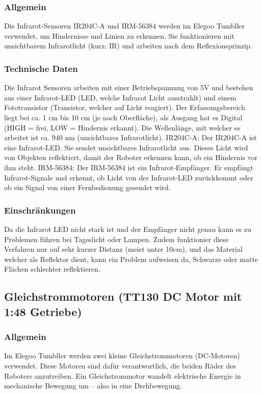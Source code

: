 \subsubsection{Allgemein}
Die Infrarot-Sensoren IR204C-A und IRM-56384 werden im Elegoo Tumbller verwendet, um Hindernisse und Linien zu erkennen.
Sie funktionieren mit unsichtbarem Infrarotlicht (kurz: IR) und arbeiten nach dem Reflexionsprinzip.
\subsubsection{Technische Daten}
Die Infrarot Sensoren arbeiten mit einer Betriebspannung von 5V und bestehen aus einer Infrarot-LED (LED, welche Infrarot Licht ausstrahlt) und 
einem Fototransistor (Transistor, welcher auf Licht reagiert). 
Der Erfassungsbereich liegt bei ca. 1 cm bis 10 cm (je nach Oberfläche), als Ausgang hat es Digital (HIGH = frei, LOW = Hindernis erkannt). 
Die Wellenlänge, mit welcher es arbeitet ist ca. 940 nm (unsichtbares Infrarotlicht).
IR204C-A:
Der IR204C-A ist eine Infrarot-LED. Sie sendet unsichtbares Infrarotlicht aus. 
Dieses Licht wird von Objekten reflektiert, damit der Roboter erkennen kann, ob ein Hindernis vor ihm steht.
IRM-56384:
Der IRM-56384 ist ein Infrarot-Empfänger. Er empfängt Infrarot-Signale und erkennt, ob Licht von der Infrarot-LED zurückkommt oder ob ein Signal von einer Fernbedienung gesendet wird.
\subsubsection{Einschränkungen}
Da die Infrarot LED nicht stark ist  und der Empfänger nicht genau kann es zu Problemen führen bei Tageslicht oder Lampen. 
Zudem funktionier diese Verfahren nur auf sehr kurzer Distanz (meist unter 10cm), und das Material welcher als Reflektor dient, kann ein Problem aufweisen da, 
Schwarze oder matte Flächen schlechter reflektieren.
%
\subsection{Gleichstrommotoren (TT130 DC Motor mit 1:48 Getriebe)}
%
\subsubsection{Allgemein}
Im Elegoo Tumbller werden zwei kleine Gleichstrommotoren (DC-Motoren) verwendet.
Diese Motoren sind dafür verantwortlich, die beiden Räder des Roboters anzutreiben.
Ein Gleichstrommotor wandelt elektrische Energie in mechanische Bewegung um – also in eine Drehbewegung.
